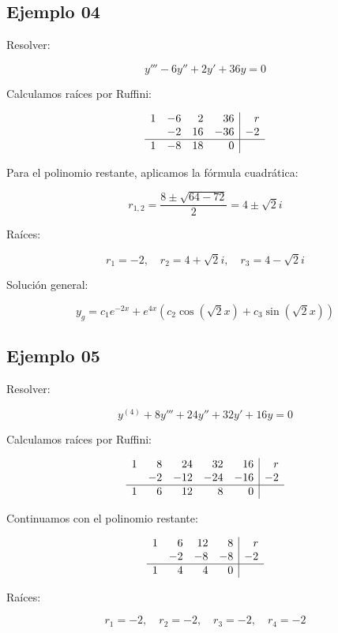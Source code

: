 \subsection{Ejemplo 04}

Resolver:

\[
y'''-6y''+2y'+36y=0
\]

Calculamos raíces por Ruffini:

\[
\begin{array}{ r r r r|r }
1 & -6 & 2 & 36 & r\\
 & -2 & 16 & -36 & -2\\
\hline
1 & -8 & 18 & 0 &  
\end{array}
\]

Para el polinomio restante, aplicamos la fórmula cuadrática:

\[
r_{1,2} =\frac{8\pm \sqrt{64-72}}{2} = 4\pm \sqrt{2} i
\]

Raíces:

\[
r_1 = -2, \quad r_2 = 4 + \sqrt{2} i, \quad r_3 = 4 - \sqrt{2} i
\]

Solución general:

\[
y_{g} = c_{1} e^{-2x} +e^{4x} \left( c_{2} \cos(\sqrt{2} x) + c_{3} \sin(\sqrt{2} x) \right)
\]

\subsection{Ejemplo 05}

Resolver:

\[
y^{(4)} +8y''' + 24y'' + 32y' + 16y = 0
\]

Calculamos raíces por Ruffini:

\[
\begin{array}{ r r r r r|r }
1 & 8 & 24 & 32 & 16 & r\\
 & -2 & -12 & -24 & -16 & -2\\
\hline
1 & 6 & 12 & 8 & 0 &  
\end{array}
\]

Continuamos con el polinomio restante:

\[
\begin{array}{ r r r r|r }
1 & 6 & 12 & 8 & r\\
 & -2 & -8 & -8 & -2\\
\hline
1 & 4 & 4 & 0 &  
\end{array}
\]

Raíces:

\[
r_1 = -2, \quad r_2 = -2, \quad r_3 = -2, \quad r_4 = -2
\]

